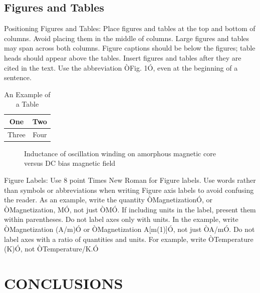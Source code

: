 \documentclass[letterpaper, 10 pt, conference]{ieeeconf}  %
\begin{document}
\subsection{Figures and Tables}

Positioning Figures and Tables: Place figures and tables at the top and bottom of columns. Avoid placing them in the middle of columns. Large figures and tables may span across both columns. Figure captions should be below the figures; table heads should appear above the tables. Insert figures and tables after they are cited in the text. Use the abbreviation ÒFig. 1Ó, even at the beginning of a sentence.

\begin{table}[h]
\caption{An Example of a Table}
\label{table_example}
\begin{center}
\begin{tabular}{|c||c|}
\hline
One & Two\\
\hline
Three & Four\\
\hline
\end{tabular}
\end{center}
\end{table}


   \begin{figure}[thpb]
      \centering
      \caption{Inductance of oscillation winding on amorphous
       magnetic core versus DC bias magnetic field}
      \label{figurelabel}
   \end{figure}


Figure Labels: Use 8 point Times New Roman for Figure labels. Use words rather than symbols or abbreviations when writing Figure axis labels to avoid confusing the reader. As an example, write the quantity ÒMagnetizationÓ, or ÒMagnetization, MÓ, not just ÒMÓ. If including units in the label, present them within parentheses. Do not label axes only with units. In the example, write ÒMagnetization (A/m)Ó or ÒMagnetization {A[m(1)]}Ó, not just ÒA/mÓ. Do not label axes with a ratio of quantities and units. For example, write ÒTemperature (K)Ó, not ÒTemperature/K.Ó

\section{CONCLUSIONS}
\end{document}
